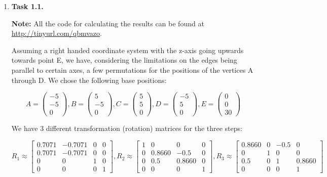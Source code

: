 \documentclass[a4paper,11pt]{article}
\author{\authorinfo}
\title{\titleinfo}
\date{\today}
\newcommand{\V}[1]{\begin{pmatrix}#1\end{pmatrix}}
\begin{document}
\maketitle
\begin {enumerate}
\item[\textbf{Task 1.1.}]

    \textbf{Note:} All the code for calculating the results can be found at \url{http://tinyurl.com/qbmvazo}.

    Assuming a right handed coordinate system with the z-axis going upwards
    towards point E, we have, considering the limitations on the edges being
    parallel to certain axes, a few permutations for the positions of the
    vertices A through D. We chose the following base positions:

    $$
    A = \V{-5\\-5\\0},
    B = \V{5\\-5\\0},
    C = \V{5\\5\\0},
    D = \V{-5\\5\\0},
    E = \V{0\\0\\30}
    $$

    We have 3 different transformation (rotation) matrices for the three steps:

    $$
        R_1 \approx \begin{bmatrix}
            0.7071& -0.7071 & 0 & 0\\
            0.7071& -0.7071 & 0 & 0\\
            0 & 0 & 1 & 0\\
            0 & 0 & 0 & 1
        \end{bmatrix},
        R_2 \approx \begin{bmatrix}
            1 & 0 & 0 & 0 \\
            0 & 0.8660 & -0.5 & 0 \\
            0 & 0.5 & 0.8660 & 0 \\
            0 & 0 & 0 & 1
        \end{bmatrix},
        R_3 \approx \begin{bmatrix}
            0.8660& 0 & -0.5 & 0\\
            0 & 1 & 0 & 0\\
            0.5 & 0 & 1 & 0.8660\\
            0 & 0 & 0 & 1
        \end{bmatrix}
    $$


\end{enumerate}
\end{document}

